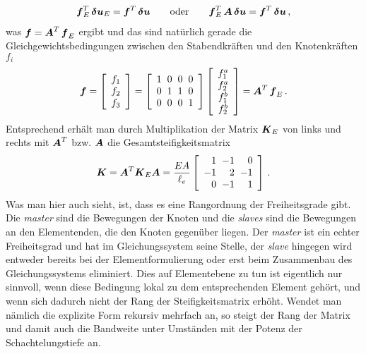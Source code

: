 \begin{align}\label{Eq25}
\mbox{\boldmath $f$}_E^T\,\mbox{\boldmath $\delta$} \mbox{\boldmath $u$}_E = \mbox{\boldmath $f$}^T\,\mbox{\boldmath $\delta$} \mbox{\boldmath $u$} \qquad \text{oder} \qquad \mbox{\boldmath $f$}_E^T\,\mbox{\boldmath $A$}\,\mbox{\boldmath $\delta$}\mbox{\boldmath $u$} = \mbox{\boldmath $f$}^T\,\mbox{\boldmath $\delta$}\mbox{\boldmath $u$}\,,
\end{align}
was $\mbox{\boldmath $f$} = \mbox{\boldmath $A$}^T\,\mbox{\boldmath $f$}_E$ ergibt und das sind nat\"{u}rlich gerade die Gleichgewichtsbedingungen zwischen den Stabendkr\"{a}ften und den Knotenkr\"{a}ften $f_i$
\begin{align}
\vek f = \left[ \barr{c} f_1 \\ f_2 \\ f_3 \earr \right] = \left [
\barr {r @{\hspace{2mm}} r @{\hspace{2mm}} r @{\hspace{2mm}} r} 1 & 0 & 0 & 0 \\ 0 & 1 & 1 & 0 \\ 0 & 0 & 0 & 1 \earr \right] \left[ \barr{c} f_1^a \\ f_2^a \\ f_1^b \\ f_2^b \earr \right] = \vek A^T\,\vek f_E\,.
\end{align}
Entsprechend erh\"{a}lt man durch Multiplikation der Matrix $\mbox{\boldmath $K$}_E$ von links und rechts mit
$\mbox{\boldmath $A$}^T$ bzw. $\mbox{\boldmath $A$}$ die Gesamtsteifigkeitsmatrix
\begin{align}
\vek K = \vek A^T \vek K_E \vek A = \frac{EA}{\ell_e} \left [
\barr {r @{\hspace{2mm}} r @{\hspace{2mm}} r} 1 & -1 & 0  \\ -1 & 2 &-1 \\ 0 &-1 &1\earr \right]\,.
\end{align}
Was man hier auch sieht, ist, dass es eine Rangordnung der Freiheitsgrade gibt. Die {\em master\/} sind die Bewegungen der Knoten und die {\em slaves\/} sind die Bewegungen an den Elementenden, die den Knoten gegen\"{u}ber liegen. Der {\em master\/} ist ein echter Freiheitsgrad und hat im Gleichungssystem seine Stelle, der {\em slave\/} hingegen wird entweder bereits bei der Elementformulierung oder erst beim Zusammenbau des Gleichungssystems eliminiert. Dies auf Elementebene zu tun ist eigentlich nur sinnvoll, wenn diese Bedingung lokal zu dem entsprechenden Element geh\"{o}rt, und wenn sich dadurch nicht der Rang der Steifigkeitsmatrix erh\"{o}ht. Wendet man n\"{a}mlich die explizite Form rekursiv mehrfach an, so steigt der Rang der Matrix und damit auch die Bandweite unter Umst\"{a}nden mit der Potenz der Schachtelungstiefe an.

